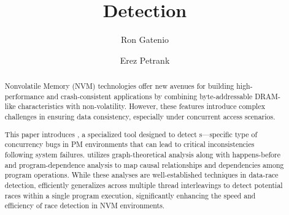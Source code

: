 \documentclass[nonacm,sigplan]{acmart}
\begin{document}
\title{\NameRace Detection}



\author{Ron Gatenio}

\author{Erez Petrank}


\begin{abstract}


Nonvolatile Memory (NVM) technologies offer new avenues for building high-performance and crash-consistent applications by combining byte-addressable DRAM-like characteristics with non-volatility. However, these features introduce complex challenges in ensuring data consistency, especially under concurrent access scenarios.

This paper introduces \SignRaceDetector, a specialized tool designed to detect {\NameRace}s—specific type of concurrency bugs in PM environments that can lead to critical inconsistencies following system failures.
\SignRaceDetector utilizes graph-theoretical analysis along with happens-before and program-dependence analysis to map causal relationships and dependencies among program operations. While these analyses are well-established techniques in data-race detection, \SignRaceDetector efficiently generalizes across multiple thread interleavings to detect potential races within a single program execution, significantly enhancing the speed and efficiency of race detection in NVM environments.


\end{abstract}


\maketitle %
\pagestyle{plain} %
\end{document}
